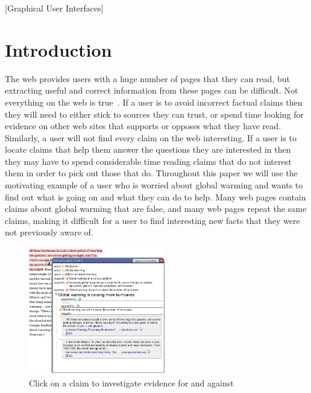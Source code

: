 \documentclass{chi2009}
\begin{document}

[Graphical User Interfaces]

\section{Introduction}

The web provides users with a huge number of pages that they can read, but extracting useful and correct information from these pages can be difficult. Not everything on the web is true~\cite{bbcwebwarning}. If a user is to avoid incorrect factual claims then they will need to either stick to sources they can trust, or spend time looking for evidence on other web sites that supports or opposes what they have read. Similarly, a user will not find every claim on the web interesting. If a user is to locate claims that help them answer the questions they are interested in then they may have to spend considerable time reading claims that do not interest them in order to pick out those that do. Throughout this paper we will use the motivating example of a user who is worried about global warming and wants to find out what is going on and what they can do to help. Many web pages contain claims about global warming that are false, and many web pages repeat the same claims, making it difficult for a user to find interesting new facts that they were not previously aware of.

\begin{figure}[tb]
	\begin{center}
	\includegraphics[width=6cm]{../screenshots/claim_popup_crop2.png}
	\caption{Click on a claim to investigate evidence for and against}
	\label{claimview}
	\end{center}
\end{figure}
\end{document}
